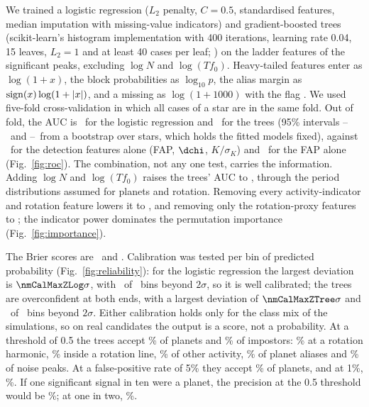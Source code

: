 We trained a logistic regression ($L_2$ penalty, $C = 0.5$, standardised features,
median imputation with missing-value indicators) and gradient-boosted trees
(scikit-learn's histogram implementation with 400 iterations, learning rate 0.04,
15 leaves, $L_2 = 1$ and at least 40 cases per leaf; \citealt{Pedregosa2011}) on the
ladder features of the significant peaks, excluding $\log N$ and $\log(T f_0)$. Heavy-tailed
features enter as $\log(1+x)$, the block probabilities as $\log_{10} p$, the alias
margin as ${\rm sign}(x)\log(1+|x|)$, and a missing  as $\log(1+1000)$
with the flag . We used five-fold cross-validation in which all
cases of a star are in the same fold. Out of fold, the AUC is \nmAucLog\ for the
logistic regression and \nmAucTree\ for the trees (95\% intervals
\nmAucLogLo--\nmAucLogHi\ and \nmAucTreeLo--\nmAucTreeHi\ from a bootstrap over stars,
which holds the fitted models fixed), against \nmAucDetOnly\ for the detection features
alone (FAP, $\dchi$, $K/\sigma_K$) and \nmAucFapOnly\ for the FAP alone
(Fig.~\ref{fig:roc}). The combination, not any one test, carries the information. Adding
$\log N$ and $\log(T f_0)$ raises the trees' AUC to \nmAucTreePrior, through the period
distributions assumed for planets and rotation. Removing every activity-indicator and
rotation feature lowers it to \nmAucNoInd, and removing only the rotation-proxy features
to \nmAucNoProxy; the indicator power dominates the permutation importance
(Fig.~\ref{fig:importance}).

The Brier scores are \nmBrierLog\ and \nmBrierTree. Calibration was tested per bin of
predicted probability (Fig.~\ref{fig:reliability}): for the logistic regression the
largest deviation is $\nmCalMaxZLog\sigma$, with \nmCalNBadLog\ of \nmCalNBinsLog\ bins
beyond $2\sigma$, so it is well calibrated; the trees are overconfident at both ends, with
a largest deviation of $\nmCalMaxZTree\sigma$ and \nmCalNBadTree\ of \nmCalNBinsTree\ bins
beyond $2\sigma$. Either calibration holds only for the class mix of the simulations, so
on real candidates the output is a score, not a probability. At a
threshold of 0.5 the trees accept \nmTreeTPR\% of planets and \nmTreeFPR\% of
impostors: \nmTreeAccRotHarm\% at a rotation harmonic, \nmTreeAccRotLine\% inside a
rotation line, \nmTreeAccActOther\% of other activity, \nmTreeAccPlAlias\% of planet
aliases and \nmTreeAccNoise\% of noise peaks. At a false-positive rate of 5\% they
accept \nmTreeTPRatFiveFPR\% of planets, and at 1\%, \nmTreeTPRatOneFPR\%. If one
significant signal in ten were a planet, the precision at the 0.5 threshold would be
\nmTreePPVTen\%; at one in two, \nmTreePPVFifty\%.

